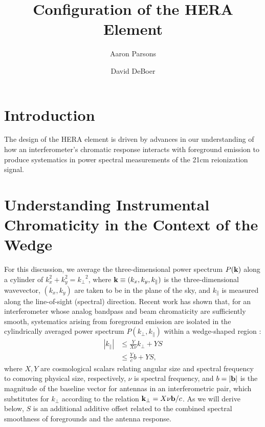 \documentclass[11pt]{article}
\newcommand{\kvec}{{\bf k}}
\newcommand{\bvec}{{\bf b}}
\newcommand{\kpr}{{k_\perp}}
\newcommand{\kvpr}{{\kvec_\perp}}
\newcommand{\kpl}{{k_\parallel}}
\begin{document}
\title{Configuration of the HERA Element}
\author{Aaron Parsons \and David DeBoer}
\maketitle

\section{Introduction}

The design of the HERA element is driven by advances in our understanding of how
an interferometer's chromatic response interacts with foreground emission to
produce systematics in power spectral measurements of the 21cm reionization signal.

\section{Understanding Instrumental Chromaticity in the Context of the Wedge}

For this discussion, we average the three-dimensional power spectrum $P(\kvec)$ along a cylinder
of $k_x^2+k_y^2=\kpr^2$, where $\kvec\equiv(k_x,k_y,\kpl)$ is the three-dimensional wavevector,
$(k_x,k_y)$ are taken to be in the plane of the sky, and $\kpl$ is measured along the line-of-sight (spectral)
direction.
Recent work has shown that, for an interferometer whose
analog bandpass and beam chromaticity are sufficiently smooth, systematics arising from foreground emission
are isolated in the cylindrically averaged power spectrum $P(\kpr,\kpl)$ within
a wedge-shaped region \citep{2012ApJ...756..165P,2013ApJ...768L..36P,2014ApJ...788..106P,2015arXiv150206016A}:
\begin{align}
|\kpl| &\le \frac{Y}{X\nu}\kpr + YS\nonumber\\
&\le \frac{Y}{c}b + YS,
\label{eq:wedge_bound}
\end{align}
where $X,Y$ are cosmological scalars relating angular size and spectral frequency to comoving 
physical size, respectively, $\nu$ is spectral frequency, and $b=|\bvec|$ is the magnitude of the baseline vector for
antennas in an interferometric pair, which substitutes for $\kpr$ according to the
relation $\kvpr=X\nu\bvec/c$. As we will derive below, $S$ is an additional additive offset related to
the combined spectral smoothness of foregrounds and the antenna response.
\end{document}
